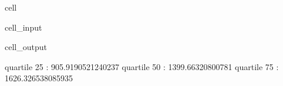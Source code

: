 \documentclass[letterpaper,10pt,english]{jupyterBook}
\begin{document}
\begin{sphinxuseclass}{cell}
\begin{sphinxVerbatimInput}
\begin{sphinxuseclass}{cell_input}
\end{sphinxuseclass}\end{sphinxVerbatimInput}
\begin{sphinxVerbatimOutput}

\begin{sphinxuseclass}{cell_output}
\begin{sphinxVerbatim}[commandchars=\\\{\}]
quartile  25  :  905.9190521240237
quartile  50  :  1399.66320800781
quartile  75  :  1626.326538085935
\end{sphinxVerbatim}

\noindent{}

\end{sphinxuseclass}\end{sphinxVerbatimOutput}

\end{sphinxuseclass}
\end{document}
